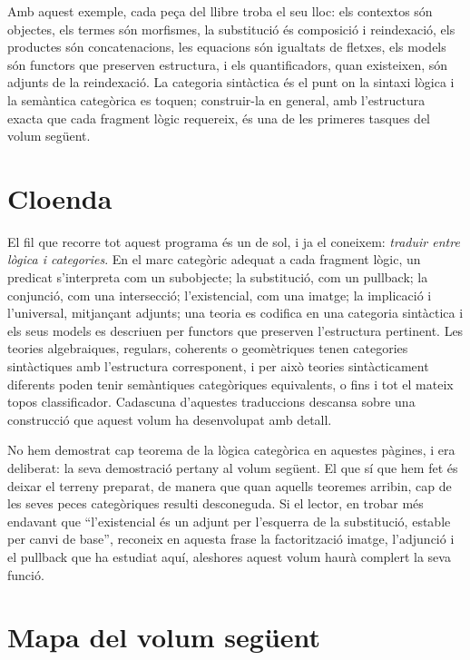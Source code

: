 Amb aquest exemple, cada peça del llibre troba el seu lloc: els contextos són objectes, els termes són morfismes, la substitució és composició i reindexació, els productes són concatenacions, les equacions són igualtats de fletxes, els models són functors que preserven estructura, i els quantificadors, quan existeixen, són adjunts de la reindexació. La categoria sintàctica és el punt on la sintaxi lògica i la semàntica categòrica es toquen; construir-la en general, amb l'estructura exacta que cada fragment lògic requereix, és una de les primeres tasques del volum següent.

\section{Cloenda}

El fil que recorre tot aquest programa és un de sol, i ja el coneixem: \emph{traduir entre lògica i categories}. En el marc categòric adequat a cada fragment lògic, un predicat s'interpreta com un subobjecte; la substitució, com un pullback; la conjunció, com una intersecció; l'existencial, com una imatge; la implicació i l'universal, mitjançant adjunts; una teoria es codifica en una categoria sintàctica i els seus models es descriuen per functors que preserven l'estructura pertinent. Les teories algebraiques, regulars, coherents o geomètriques tenen categories sintàctiques amb l'estructura corresponent, i per això teories sintàcticament diferents poden tenir semàntiques categòriques equivalents, o fins i tot el mateix topos classificador. Cadascuna d'aquestes traduccions descansa sobre una construcció que aquest volum ha desenvolupat amb detall.

No hem demostrat cap teorema de la lògica categòrica en aquestes pàgines, i era deliberat: la seva demostració pertany al volum següent. El que sí que hem fet és deixar el terreny preparat, de manera que quan aquells teoremes arribin, cap de les seves peces categòriques resulti desconeguda. Si el lector, en trobar més endavant que \enquote{l'existencial és un adjunt per l'esquerra de la substitució, estable per canvi de base}, reconeix en aquesta frase la factorització imatge, l'adjunció i el pullback que ha estudiat aquí, aleshores aquest volum haurà complert la seva funció.

\section{Mapa del volum següent}\label{sec:mapa-volum-seguent}

